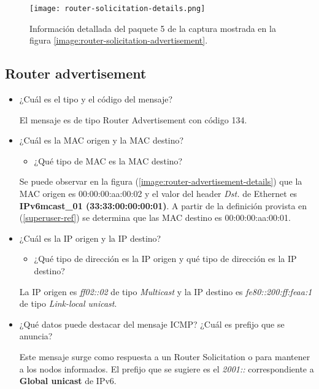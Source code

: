 \documentclass[osajnl,twocolumn,showpacs,superscriptaddress,10pt]{revtex4-1} %
\begin{document}
\begin{figure}[H]
    \centering
    \texttt{[image: router-solicitation-details.png]}
    \caption{Información detallada del paquete 5 de la captura mostrada en la figura \ref{image:router-solicitation-advertisement}.}
    \label{image:router-solicitation-details}
\end{figure}

\subsection{Router advertisement}

\begin{itemize}
    \item ¿Cuál es el tipo y el código del mensaje?
    
    El mensaje es de tipo Router Advertisement con código 134.

    \item ¿Cuál es la MAC origen y la MAC destino?
    
    \begin{itemize}
        \item ¿Qué tipo de MAC es la MAC destino?
    \end{itemize}

    Se puede observar en la figura (\ref{image:router-advertisement-details}) que la MAC origen es 00:00:00:aa:00:02 y el valor del header \textit{Dst.} de Ethernet
    es \textbf{IPv6mcast\_01 (33:33:00:00:00:01)}. A partir de la definición provista en (\ref{superuser-ref}) se determina que
    las MAC destino es 00:00:00:aa:00:01.
    
    \item ¿Cuál es la IP origen y la IP destino?
    
    \begin{itemize}
        \item ¿Qué tipo de dirección es la IP origen y qué tipo de dirección es la IP destino?
    \end{itemize}
    
    La IP origen es \textit{ff02::02} de tipo \textit{Multicast} y la IP destino es \textit{fe80::200:ff:feaa:1} de tipo \textit{Link-local unicast}.

    \item ¿Qué datos puede destacar del mensaje ICMP? ¿Cuál es prefijo que se anuncia?
    
    Este mensaje surge como respuesta a un Router Solicitation o para mantener a los nodos informados. El prefijo
    que se sugiere es el \textit{2001::} correspondiente a \textbf{Global unicast} de IPv6.
\end{itemize}
\end{document}
